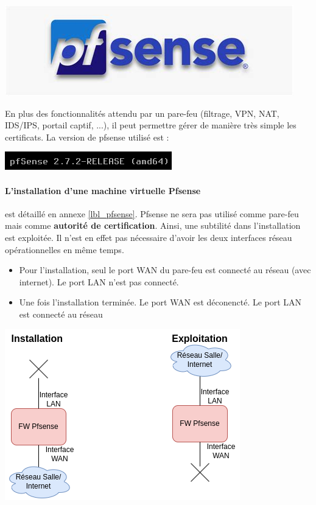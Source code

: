\documentclass[french, 12pt]{article}%
\newcommand{\itemE}{\item[$\bullet$]}
\begin{document}
\begin{center}
\includegraphics[scale=0.4]{./ressource/pfsenseLogo}
\end{center}

En plus des fonctionnalités attendu par un pare-feu (filtrage, VPN, NAT, IDS/IPS, portail captif, ...), il peut permettre gérer de manière très simple les certificats. La version de pfsense utilisé est : 
\begin{center}
\includegraphics[scale=0.7]{./ressource/versionPfsense}
\end{center}


\paragraph{L'installation d'une machine virtuelle Pfsense} est détaillé en annexe \ref{lbl_pfsense}.  Pfsense ne sera pas utilisé comme pare-feu mais comme \textbf{autorité de certification}.  Ainsi, une subtilité dans l'installation est exploitée. Il n'est en effet pas nécessaire d'avoir les deux interfaces réseau opérationnelles en même temps. 
\begin{itemize}
\itemE Pour l'installation, seul le port WAN du pare-feu est connecté au réseau (avec internet). Le port LAN n'est pas connecté.
\itemE Une fois l'installation terminée. Le port WAN est déconencté. Le port LAN est connecté au réseau
\end{itemize}

\begin{center}
\includegraphics[scale=0.7]{./ressource/installPfense.png}
\end{center}
\end{document}

